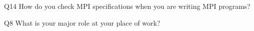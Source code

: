 \begin{description}%
\item{Q14} How do you check MPI specifications when you are writing MPI programs?%
\item{Q8} What is your major role at your place of work?%
\end{description}%
